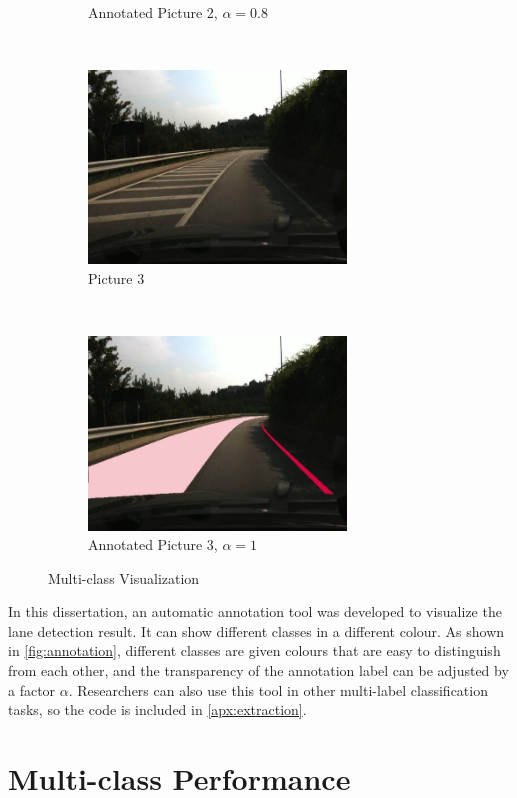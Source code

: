 \begin{spacing}{1.5}
\begin{figure}[htbp]
\begin{subfigure}[b]{0.49\textwidth}
        \caption{Annotated Picture 2, $\alpha=0.8$}
    \end{subfigure}
    \\
    \begin{subfigure}[b]{0.49\textwidth}
        \centering
        \includegraphics[width=2.7in, fbox]{Chapter5/Picture3.jpg}
        \caption{Picture 3}
    \end{subfigure}%
    ~
    \begin{subfigure}[b]{0.49\textwidth}
        \centering
        \includegraphics[width=2.7in, fbox]{Chapter5/Picture3an.jpg}
        \caption{Annotated Picture 3, $\alpha=1$}
    \end{subfigure}
    \caption{Multi-class Visualization}
    \label{fig:annotation}
\end{figure}


In this dissertation, an automatic annotation tool was developed to visualize the lane detection result. It can show different classes in a different colour. As shown in \autoref{fig:annotation}, different classes are given colours that are easy to distinguish from each other, and the transparency of the annotation label can be adjusted by a factor $\alpha$. Researchers can also use this tool in other multi-label classification tasks, so the code is included in \autoref{apx:extraction}.

\newpage

\section{Multi-class Performance}
\label{sec:EX_multiclass}


\end{spacing}
